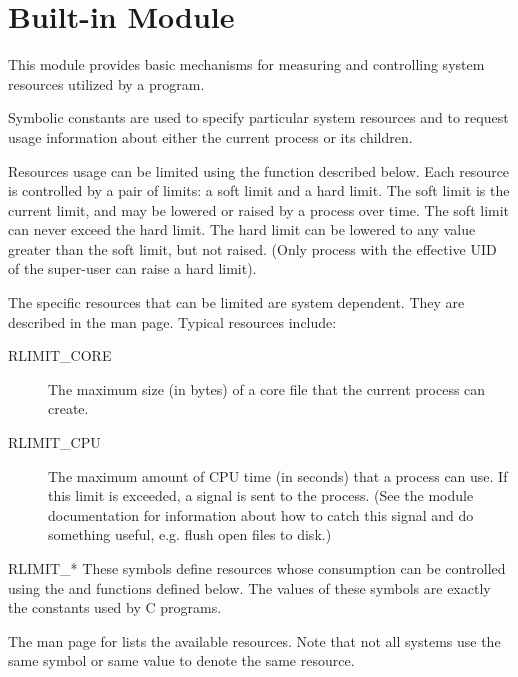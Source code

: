 \section{Built-in Module }
\label{module-resource}

This module provides basic mechanisms for measuring and controlling
system resources utilized by a program.

Symbolic constants are used to specify particular system resources and
to request usage information about either the current process or its
children. 

Resources usage can be limited using the  function
described below. Each resource is controlled by a pair of limits: a
soft limit and a hard limit. The soft limit is the current limit, and
may be lowered or raised by a process over time. The soft limit can
never exceed the hard limit. The hard limit can be lowered to any
value greater than the soft limit, but not raised. (Only process with
the effective UID of the super-user can raise a hard limit).

The specific resources that can be limited are system dependent. They
are described in the  man page. Typical resources
include:

\begin{description}

\item[RLIMIT_CORE]
The maximum size (in bytes) of a core file that the current process
can create.

\item[RLIMIT_CPU]
The maximum amount of CPU time (in seconds) that a process can use. If
this limit is exceeded, a  signal is sent to the
process. (See the  module documentation for information
about how to catch this signal and do something useful, e.g. flush
open files to disk.)

\end{description}

\begin{datadesc}{RLIMIT_*}
  These symbols define resources whose consumption can be controlled
  using the  and  functions defined
  below. The values of these symbols are exactly the constants used
  by C programs.

  The \UNIX{} man page for  lists the available
  resources. Note that not all systems use the same symbol or same
  value to denote the same resource.
\end{datadesc}

